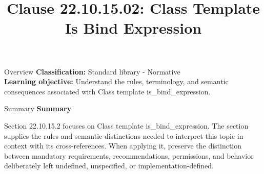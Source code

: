 \documentclass[10pt,letterpaper]{article}
\title{Clause 22.10.15.02: Class Template Is Bind Expression}
\author{}
\date{}
\begin{document}
\maketitle
\begin{CornellOverviewBox}{Overview}
\textbf{Classification:} Standard library - Normative\\[2pt]
\textbf{Learning objective:} Understand the rules, terminology, and semantic consequences associated with Class template is\_bind\_expression.
\end{CornellOverviewBox}\begin{CornellSummaryBox}{Summary}
{\sffamily\bfseries\color{Accent} Summary}\par\vspace{3pt}Section 22.10.15.2 focuses on Class template is\_bind\_expression. The section supplies the rules and semantic distinctions needed to interpret this topic in context with its cross-references. When applying it, preserve the distinction between mandatory requirements, recommendations, permissions, and behavior deliberately left undefined, unspecified, or implementation-defined.
\end{CornellSummaryBox}
\end{document}
